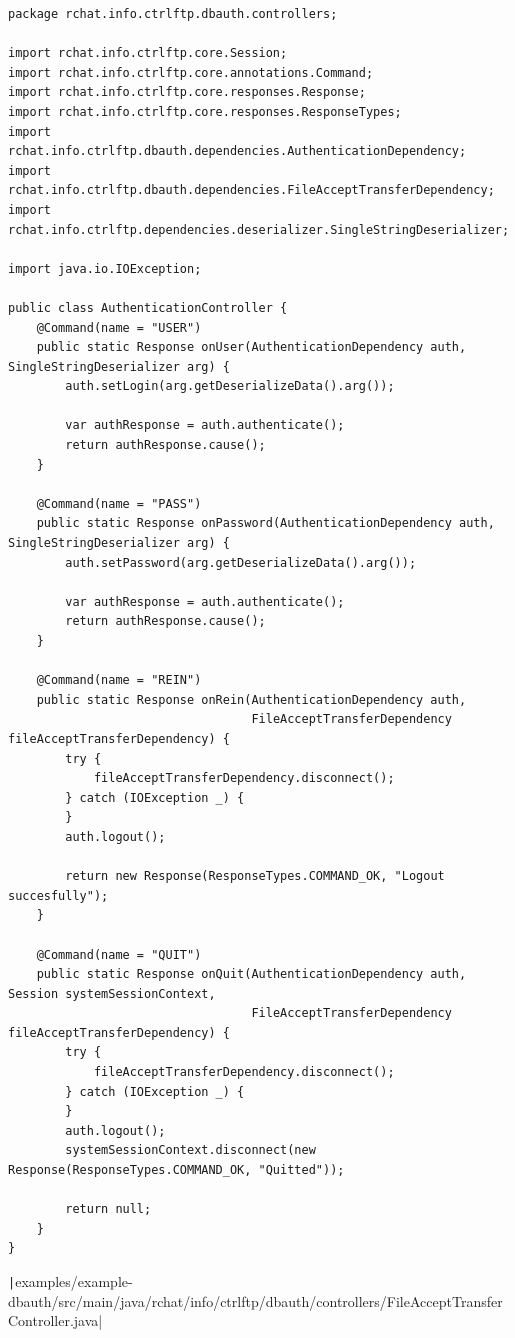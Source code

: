 \documentclass[a4paper,14pt]{extarticle}
\begin{document}
\begin{verbatim}
package rchat.info.ctrlftp.dbauth.controllers;

import rchat.info.ctrlftp.core.Session;
import rchat.info.ctrlftp.core.annotations.Command;
import rchat.info.ctrlftp.core.responses.Response;
import rchat.info.ctrlftp.core.responses.ResponseTypes;
import rchat.info.ctrlftp.dbauth.dependencies.AuthenticationDependency;
import rchat.info.ctrlftp.dbauth.dependencies.FileAcceptTransferDependency;
import rchat.info.ctrlftp.dependencies.deserializer.SingleStringDeserializer;

import java.io.IOException;

public class AuthenticationController {
    @Command(name = "USER")
    public static Response onUser(AuthenticationDependency auth, SingleStringDeserializer arg) {
        auth.setLogin(arg.getDeserializeData().arg());

        var authResponse = auth.authenticate();
        return authResponse.cause();
    }

    @Command(name = "PASS")
    public static Response onPassword(AuthenticationDependency auth, SingleStringDeserializer arg) {
        auth.setPassword(arg.getDeserializeData().arg());

        var authResponse = auth.authenticate();
        return authResponse.cause();
    }

    @Command(name = "REIN")
    public static Response onRein(AuthenticationDependency auth,
                                  FileAcceptTransferDependency fileAcceptTransferDependency) {
        try {
            fileAcceptTransferDependency.disconnect();
        } catch (IOException _) {
        }
        auth.logout();

        return new Response(ResponseTypes.COMMAND_OK, "Logout succesfully");
    }

    @Command(name = "QUIT")
    public static Response onQuit(AuthenticationDependency auth, Session systemSessionContext,
                                  FileAcceptTransferDependency fileAcceptTransferDependency) {
        try {
            fileAcceptTransferDependency.disconnect();
        } catch (IOException _) {
        }
        auth.logout();
        systemSessionContext.disconnect(new Response(ResponseTypes.COMMAND_OK, "Quitted"));

        return null;
    }
}
\end{verbatim}
\texttt|examples/example-dbauth/src/main/java/rchat/info/ctrlftp/dbauth/controllers/FileAcceptTransferController.java|
\end{document}
